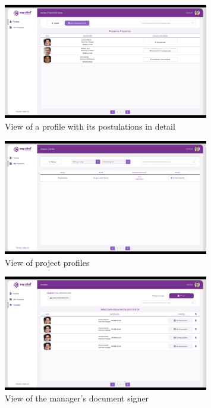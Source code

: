 \documentclass{scrreprt}
\begin{document}
\begin{figure}[H]
	\centering \small
	\includegraphics[width=0.8\textwidth]{WebPrototype/wflow-19.jpeg}
	\caption{View of a profile with its postulations in detail}
\end{figure}

\begin{figure}[H]
	\centering \small
	\includegraphics[width=0.8\textwidth]{WebPrototype/wflow-20.jpeg}
	\caption{View of project profiles}
\end{figure}


\begin{figure}[H]
	\centering \small
	\includegraphics[width=0.8\textwidth]{WebPrototype/wflow-21.jpeg}
	\caption{View of the manager's document signer}
\end{figure}
\end{document}
